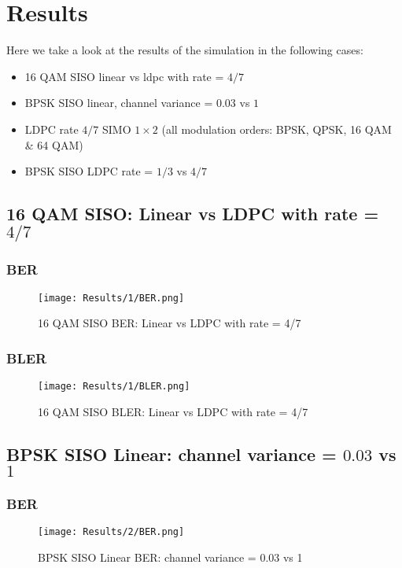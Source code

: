\section{Results}
Here we take a look at the results of the simulation in the following cases:
\begin{itemize}
    \item 16 QAM SISO linear vs ldpc with rate = $4/7$
    \item BPSK SISO linear, channel variance = $0.03$ vs $1$
    \item LDPC rate $4/7$ SIMO $1 \times 2$ (all modulation orders: BPSK, QPSK, 16 QAM \& 64 QAM)
    \item BPSK SISO LDPC rate = $1/3$ vs $4/7$
\end{itemize}

\subsection{16 QAM SISO: Linear vs LDPC with rate = $4/7$}
\subsubsection{BER}
\begin{figure}[H]
    \centering
    \texttt{[image: Results/1/BER.png]}
    \caption{16 QAM SISO BER: Linear vs LDPC with rate = 4/7}
\end{figure}
\subsubsection{BLER}
\begin{figure}[H]
    \centering
    \texttt{[image: Results/1/BLER.png]}
    \caption{16 QAM SISO BLER: Linear vs LDPC with rate = 4/7}
\end{figure}

\subsection{BPSK SISO Linear: channel variance = $0.03$ vs $1$}
\subsubsection{BER}
\begin{figure}[H]
    \centering
    \texttt{[image: Results/2/BER.png]}
    \caption{BPSK SISO Linear BER: channel variance = 0.03 vs 1}
\end{figure}
